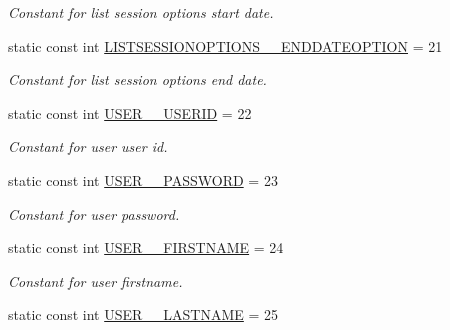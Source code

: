 \begin{DoxyCompactItemize}
\begin{DoxyCompactList}\small\item\em Constant for list session options start date. \item\end{DoxyCompactList}\item 
\hypertarget{classUMS__Data_1_1UMS__DataPackage_ac4ae1bca502b520be1c21d53d956560f}{
static const int \hyperlink{classUMS__Data_1_1UMS__DataPackage_ac4ae1bca502b520be1c21d53d956560f}{LISTSESSIONOPTIONS\_\-\_\-ENDDATEOPTION} = 21}
\label{classUMS__Data_1_1UMS__DataPackage_ac4ae1bca502b520be1c21d53d956560f}

\begin{DoxyCompactList}\small\item\em Constant for list session options end date. \item\end{DoxyCompactList}\item 
\hypertarget{classUMS__Data_1_1UMS__DataPackage_a29433fbaf7f0cc57b9e7eefb9de35121}{
static const int \hyperlink{classUMS__Data_1_1UMS__DataPackage_a29433fbaf7f0cc57b9e7eefb9de35121}{USER\_\-\_\-USERID} = 22}
\label{classUMS__Data_1_1UMS__DataPackage_a29433fbaf7f0cc57b9e7eefb9de35121}

\begin{DoxyCompactList}\small\item\em Constant for user user id. \item\end{DoxyCompactList}\item 
\hypertarget{classUMS__Data_1_1UMS__DataPackage_abe5596acbc5f30980eb210be6aacba9b}{
static const int \hyperlink{classUMS__Data_1_1UMS__DataPackage_abe5596acbc5f30980eb210be6aacba9b}{USER\_\-\_\-PASSWORD} = 23}
\label{classUMS__Data_1_1UMS__DataPackage_abe5596acbc5f30980eb210be6aacba9b}

\begin{DoxyCompactList}\small\item\em Constant for user password. \item\end{DoxyCompactList}\item 
\hypertarget{classUMS__Data_1_1UMS__DataPackage_acf96426d11e7e9d34125959a91febec6}{
static const int \hyperlink{classUMS__Data_1_1UMS__DataPackage_acf96426d11e7e9d34125959a91febec6}{USER\_\-\_\-FIRSTNAME} = 24}
\label{classUMS__Data_1_1UMS__DataPackage_acf96426d11e7e9d34125959a91febec6}

\begin{DoxyCompactList}\small\item\em Constant for user firstname. \item\end{DoxyCompactList}\item 
\hypertarget{classUMS__Data_1_1UMS__DataPackage_a83a85ef318cb21c9b14687d8a0bfe14c}{
static const int \hyperlink{classUMS__Data_1_1UMS__DataPackage_a83a85ef318cb21c9b14687d8a0bfe14c}{USER\_\-\_\-LASTNAME} = 25}
\label{classUMS__Data_1_1UMS__DataPackage_a83a85ef318cb21c9b14687d8a0bfe14c}


\end{DoxyCompactItemize}
